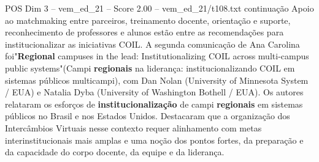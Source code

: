\begin{textsample}{POS Dim 3 – vem\_ed\_21 – Score 2.00 – vem\_ed\_21/t108.txt}  \label{ex:f3_pos_110}
continuação Apoio ao matchmaking entre parceiros, treinamento docente, orientação e suporte, reconhecimento de professores e alunos estão entre as recomendações para institucionalizar as iniciativas COIL.
A segunda comunicação de Ana Carolina foi"\textbf{Regional} campuses in the lead: Institutionalizing COIL across multi-campus public systems"(Campi \textbf{regionais} na liderança: institucionalizando COIL em sistemas públicos multicampi), com Dan Nolan (University of Minnesota System / EUA) e Natalia Dyba (University of Washington Bothell / EUA).
Os autores relataram os esforços de \textbf{institucionalização} de campi \textbf{regionais} em sistemas públicos no Brasil e nos Estados Unidos.
Destacaram que a organização dos Intercâmbios Virtuais nesse contexto requer alinhamento com metas interinstitucionais mais amplas e uma noção dos pontos fortes, da preparação e da capacidade do corpo docente, da equipe e da liderança.

\end{textsample}
